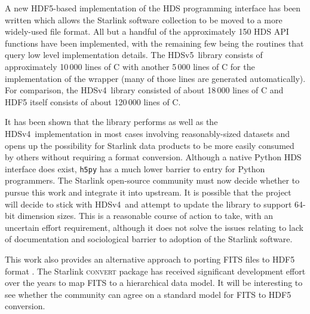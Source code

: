 \documentclass[final,authoryear,5p,times,twocolumn]{elsarticle}
\newcommand{\new}{HDSv5}
\newcommand{\old}{HDSv4}
\begin{document}
A new HDF5-based implementation of the HDS programming interface has
been written which allows the Starlink software collection to be moved
to a more widely-used file format. All but a handful of the
approximately 150 HDS API functions have been implemented, with the
remaining few being the routines that query low level implementation
details. The \new\ library consists of approximately 10\,000 lines of
C with another 5\,000 lines of C for the implementation of the wrapper
(many of those lines are generated automatically). For comparison, the
\old\ library consisted of about 18\,000 lines of C and HDF5 itself
consists of about 120\,000 lines of C.

It has been shown that the library performs as well as the \old\
implementation in most cases involving reasonably-sized datasets and
opens up the possibility for Starlink data products to be more easily
consumed by others without requiring a format conversion. Although a
native Python HDS interface does exist, \texttt{h5py}
\citep[e.g.,][]{pyhdf5} has a much lower barrier to entry for Python
programmers. The Starlink open-source community must now decide
whether to pursue this work and integrate it into upstream. It is
possible that the project will decide to stick with \old\ and attempt
to update the library to support 64-bit dimension sizes. This is a
reasonable course of action to take, with an uncertain effort
requirement, although it does not solve the issues relating to lack of
documentation and sociological barrier to adoption of the Starlink
software.

This work also provides an alternative approach to porting FITS files to
HDF5 format \citep[see e.g.,][for other options]{O4-4_adassxxiv}. The Starlink
\textsc{convert} package \citep{1997STARB..19...14C,SUN55} has
received significant development effort over the years to map FITS to
a hierarchical data model. It will be interesting to see whether the
community can agree on a standard model for FITS to HDF5 conversion.
\end{document}
